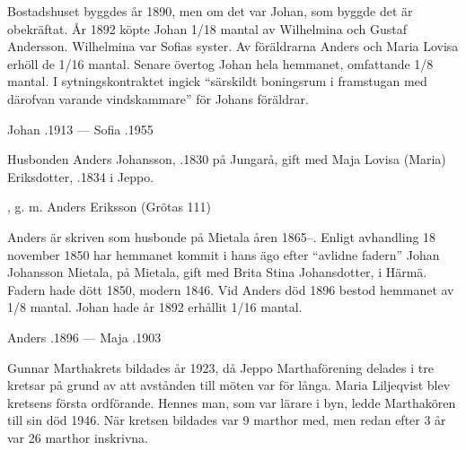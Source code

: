 Bostadshuset byggdes år 1890, men om det var Johan, som byggde det är obekräftat. År 1892 köpte Johan 1/18 mantal av Wilhelmina och Gustaf Andersson. Wilhelmina var Sofias syster. Av föräldrarna Anders och Maria Lovisa erhöll de 1/16 mantal. Senare övertog Johan hela hemmanet, omfattande 1/8 mantal. I sytningskontraktet ingick ``särskildt boningsrum i framstugan med därofvan varande vindskammare'' för Johans föräldrar.

Johan .1913  ---  Sofia .1955


Husbonden Anders Johansson,  .1830 på Jungarå, gift med Maja Lovisa (Maria) Eriksdotter, .1834 i Jeppo.
\begin{jhchildren}
  \item {}
  \item {}
  \item {}
  \item {}
  \item {}
  \item {}, g. m. Anders Eriksson (Grötas 111)
  \item {}
\end{jhchildren}

Anders är skriven som husbonde på Mietala åren 1865--. Enligt avhandling 18 november 1850 har hemmanet kommit i hans ägo efter	``avlidne fadern'' Johan Johansson Mietala,  på Mietala, gift med Brita Stina Johansdotter,  i Härmä. Fadern hade dött 1850, modern 1846.	Vid Anders död 1896 bestod hemmanet av 1/8 mantal. Johan hade år 1892 erhållit 1/16 mantal.

Anders .1896  ---  Maja .1903




Gunnar Marthakrets bildades år 1923, då Jeppo Marthaförening delades i tre kretsar på grund av att avstånden till möten var för långa. Maria Liljeqvist blev kretsens första ordförande. Hennes man, som var lärare i byn, ledde Marthakören till sin död 1946. När kretsen bildades var 9 marthor med, men redan efter 3 år var 26 marthor inskrivna.

